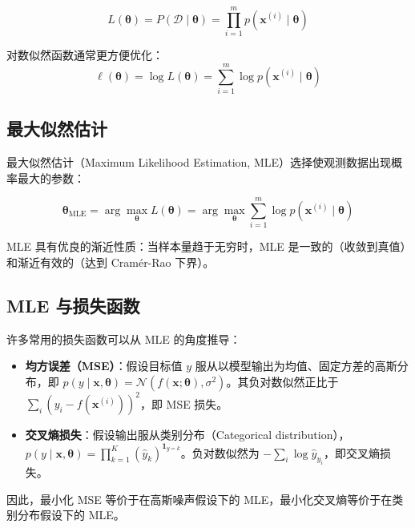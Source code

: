 \[
L(\boldsymbol{\theta}) = P(\mathcal{D}\mid\boldsymbol{\theta}) = \prod_{i=1}^{m} p(\mathbf{x}^{(i)}\mid\boldsymbol{\theta})
\]

对数似然函数通常更方便优化：
\[
\ell(\boldsymbol{\theta}) = \log L(\boldsymbol{\theta}) = \sum_{i=1}^{m} \log p(\mathbf{x}^{(i)}\mid\boldsymbol{\theta})
\]

\subsection{最大似然估计}

最大似然估计（Maximum Likelihood Estimation, MLE）选择使观测数据出现概率最大的参数：

\[
\boldsymbol{\theta}_{\mathrm{MLE}} = \arg\max_{\boldsymbol{\theta}} L(\boldsymbol{\theta}) = \arg\max_{\boldsymbol{\theta}} \sum_{i=1}^{m} \log p(\mathbf{x}^{(i)}\mid\boldsymbol{\theta})
\]

MLE 具有优良的渐近性质：当样本量趋于无穷时，MLE 是一致的（收敛到真值）和渐近有效的（达到 Cramér-Rao 下界）。

\subsection{MLE 与损失函数}

许多常用的损失函数可以从 MLE 的角度推导：

\begin{itemize}
    \item \textbf{均方误差（MSE）}：假设目标值 $y$ 服从以模型输出为均值、固定方差的高斯分布，即 $p(y\mid\mathbf{x},\boldsymbol{\theta})=\mathcal{N}(f(\mathbf{x};\boldsymbol{\theta}),\sigma^2)$。其负对数似然正比于 $\sum_{i}(y_i-f(\mathbf{x}^{(i)}))^2$，即 MSE 损失。
    \item \textbf{交叉熵损失}：假设输出服从类别分布（Categorical distribution），$p(y\mid\mathbf{x},\boldsymbol{\theta})=\prod_{k=1}^{K}(\hat{y}_k)^{\mathbf{1}_{y=k}}$。负对数似然为 $-\sum_{i}\log \hat{y}_{y_i}$，即交叉熵损失。
\end{itemize}

因此，最小化 MSE 等价于在高斯噪声假设下的 MLE，最小化交叉熵等价于在类别分布假设下的 MLE。

